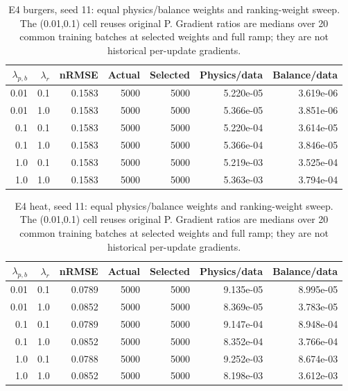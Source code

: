 \begin{table}[ht]
\centering\small
\caption{E4 burgers, seed 11: equal physics/balance weights and ranking-weight sweep. The (0.01,0.1) cell reuses original P. Gradient ratios are medians over 20 common training batches at selected weights and full ramp; they are not historical per-update gradients.}\label{tab:weights_burgers}
\begin{tabular}{@{}rrrrrrr@{}}\toprule
$\lambda_{p,b}$ & $\lambda_r$ & nRMSE & Actual & Selected & Physics/data & Balance/data\\\midrule
0.01 & 0.1 & 0.1583 & 5000 & 5000 & 5.220e-05 & 3.619e-06\\
0.01 & 1.0 & 0.1583 & 5000 & 5000 & 5.366e-05 & 3.851e-06\\
0.1 & 0.1 & 0.1583 & 5000 & 5000 & 5.220e-04 & 3.614e-05\\
0.1 & 1.0 & 0.1583 & 5000 & 5000 & 5.366e-04 & 3.846e-05\\
1.0 & 0.1 & 0.1583 & 5000 & 5000 & 5.219e-03 & 3.525e-04\\
1.0 & 1.0 & 0.1583 & 5000 & 5000 & 5.363e-03 & 3.794e-04\\
\bottomrule\end{tabular}
\end{table}

\begin{table}[ht]
\centering\small
\caption{E4 heat, seed 11: equal physics/balance weights and ranking-weight sweep. The (0.01,0.1) cell reuses original P. Gradient ratios are medians over 20 common training batches at selected weights and full ramp; they are not historical per-update gradients.}\label{tab:weights_heat}
\begin{tabular}{@{}rrrrrrr@{}}\toprule
$\lambda_{p,b}$ & $\lambda_r$ & nRMSE & Actual & Selected & Physics/data & Balance/data\\\midrule
0.01 & 0.1 & 0.0789 & 5000 & 5000 & 9.135e-05 & 8.995e-05\\
0.01 & 1.0 & 0.0852 & 5000 & 5000 & 8.369e-05 & 3.783e-05\\
0.1 & 0.1 & 0.0789 & 5000 & 5000 & 9.147e-04 & 8.948e-04\\
0.1 & 1.0 & 0.0852 & 5000 & 5000 & 8.352e-04 & 3.766e-04\\
1.0 & 0.1 & 0.0788 & 5000 & 5000 & 9.252e-03 & 8.674e-03\\
1.0 & 1.0 & 0.0852 & 5000 & 5000 & 8.198e-03 & 3.612e-03\\
\bottomrule\end{tabular}
\end{table}
